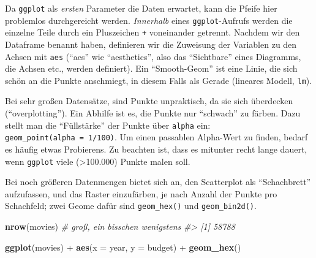 \documentclass[12pt,ngerman,]{book}
\makeatletter
\newenvironment{Shaded}{\begin{snugshade}}{\end{snugshade}}
\newcommand{\KeywordTok}[1]{\textcolor[rgb]{0.13,0.29,0.53}{\textbf{{#1}}}}
\newcommand{\DataTypeTok}[1]{\textcolor[rgb]{0.13,0.29,0.53}{{#1}}}
\newcommand{\DecValTok}[1]{\textcolor[rgb]{0.00,0.00,0.81}{{#1}}}
\newcommand{\StringTok}[1]{\textcolor[rgb]{0.31,0.60,0.02}{{#1}}}
\newcommand{\CommentTok}[1]{\textcolor[rgb]{0.56,0.35,0.01}{\textit{{#1}}}}
\newcommand{\NormalTok}[1]{{#1}}
\newenvironment{kframe}{%
\medskip{}
\setlength{\fboxsep}{.8em}
 \def\at@end@of@kframe{}%
 \ifinner\ifhmode%
  \def\at@end@of@kframe{\end{minipage}}%
  \begin{minipage}{\columnwidth}%
 \fi\fi%
 \def\FrameCommand##1{\hskip\@totalleftmargin \hskip-\fboxsep
 \colorbox{shadecolor}{##1}\hskip-\fboxsep
     \hskip-\linewidth \hskip-\@totalleftmargin \hskip\columnwidth}%
 \MakeFramed {\advance\hsize-\width
   \@totalleftmargin\z@ \linewidth\hsize
   \@setminipage}}%
 {\par\unskip\endMakeFramed%
 \at@end@of@kframe}
\renewenvironment{Shaded}{\begin{kframe}}{\end{kframe}}
\makeatother
\begin{document}
\begin{Shaded}
\end{Shaded}

Da \texttt{ggplot} als \emph{ersten} Parameter die Daten erwartet, kann
die Pfeife hier problemlos durchgereicht werden. \emph{Innerhalb} eines
\texttt{ggplot}-Aufrufs werden die einzelne Teile durch ein Pluszeichen
\texttt{+} voneinander getrennt. Nachdem wir den Dataframe benannt
haben, definieren wir die Zuweisung der Variablen zu den Achsen mit
\texttt{aes} (``aes'' wie ``aesthetics'', also das ``Sichtbare'' eines
Diagramms, die Achsen etc., werden definiert). Ein ``Smooth-Geom'' ist
eine Linie, die sich schön an die Punkte anschmiegt, in diesem Falls als
Gerade (lineares Modell, \texttt{lm}).

Bei sehr großen Datensätze, sind Punkte unpraktisch, da sie sich
überdecken (``overplotting''). Ein Abhilfe ist es, die Punkte nur
``schwach'' zu färben. Dazu stellt man die ``Füllstärke'' der Punkte
über \texttt{alpha} ein: \texttt{geom\_point(alpha\ =\ 1/100)}. Um einen
passablen Alpha-Wert zu finden, bedarf es häufig etwas Probierens. Zu
beachten ist, dass es mitunter recht lange dauert, wenn \texttt{ggplot}
viele (\textgreater{}100.000) Punkte malen soll.

Bei noch größeren Datenmengen bietet sich an, den Scatterplot als
``Schachbrett'' aufzufassen, und das Raster einzufärben, je nach Anzahl
der Punkte pro Schachfeld; zwei Geome dafür sind \texttt{geom\_hex()}
und \texttt{geom\_bin2d()}.

\begin{Shaded}
\begin{Highlighting}[]
\KeywordTok{nrow}\NormalTok{(movies)  }\CommentTok{# groß, ein bisschen wenigstens}
\CommentTok{#> [1] 58788}

\KeywordTok{ggplot}\NormalTok{(movies) +}
\StringTok{  }\KeywordTok{aes}\NormalTok{(}\DataTypeTok{x =} \NormalTok{year, }\DataTypeTok{y =} \NormalTok{budget) +}
\StringTok{  }\KeywordTok{geom_hex}\NormalTok{()}
\end{Highlighting}
\end{Shaded}
\end{document}
